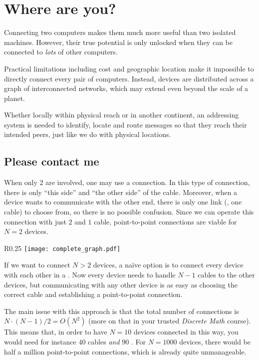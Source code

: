 
\chapter{Where are you?}\label{sec:where}

Connecting two computers makes them much more useful than two isolated machines. 
However, their true potential is only unlocked when they can be connected to \textit{lots} of other computers.

Practical limitations including cost and geographic location make it impossible to directly
connect every pair of computers. Instead, devices are distributed across a graph of interconnected networks,
which may extend even beyond the scale of a planet.

Whether locally within physical reach or in another continent, an addressing system is needed
to identify, locate and route messages so that they reach their intended peers, just like we 
do with physical locations.



\section{Please contact me}\label{sec:where:topology}

When only $2$  are involved, one may use a  connection. In this type of connection,
there is only ``this side'' and ``the other side'' of the cable. Moreover, when a device wants to communicate with the other end, 
there is only one link (\eg, one cable) to choose from, so there is no possible confusion. Since we can operate this connection 
with just $2$  and $1$ cable, point-to-point connections are viable for $N=2$ devices.

\begin{wrapfigure}{R}{0.25\linewidth}
\texttt{[image: complete\_graph.pdf]}
\end{wrapfigure}


If we want to connect $N > 2$ devices, a naïve option is to connect every device with each other
in a . Now every device needs to handle $N - 1$ cables to the other devices, 
but communicating with any other device is as easy as choosing the correct cable and establishing a point-to-point connection.

The main issue with this approach is that the total number of connections is $N \cdot (N-1) / 2 = O(N^2)$
(more on that in your trusted \textit{Discrete Math} course). This means that, in order to have $N=10$ devices connected in this way,
you would need for instance $40$ cables \textit{and} $90$ . For $N=1000$ devices, 
there would be half a million point-to-point connections, which is already quite unmanageable.

